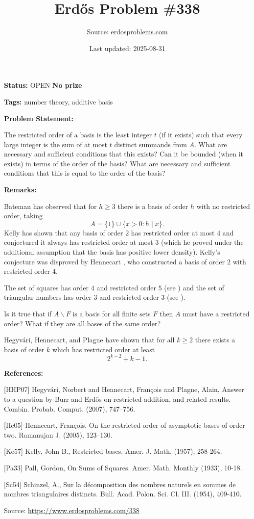 \documentclass{article}
\title{Erd\H{o}s Problem \#338}
\date{Last updated: 2025-08-31}
\author{Source: erdosproblems.com}
\begin{document}
\maketitle

\noindent\textbf{Status:} OPEN \quad \textbf{No prize}

\noindent\textbf{Tags:} number theory, additive basis

\medskip
\noindent\textbf{Problem Statement:}

The restricted order of a basis is the least integer $t$ (if it exists) such that every large integer is the sum of at most $t$ distinct summands from $A$. What are necessary and sufficient conditions that this exists? Can it be bounded (when it exists) in terms of the order of the basis? What are necessary and sufficient conditions that this is equal to the order of the basis?

\bigskip
\noindent\textbf{Remarks:}

Bateman has observed that for $h\geq 3$ there is a basis of order $h$ with no restricted order, taking\[A=\{1\}\cup \{x>0 : h\mid x\}.\]Kelly \cite{Ke57} has shown that any basis of order $2$ has restricted order at most $4$ and conjectured it always has restricted order at most $3$ (which he proved under the additional assumption that the basis has positive lower density). Kelly's conjecture was disproved by Hennecart \cite{He05}, who constructed a basis of order $2$ with restricted order $4$.

The set of squares has order $4$ and restricted order $5$ (see \cite{Pa33}) and the set of triangular numbers has order $3$ and restricted order $3$ (see \cite{Sc54}).

Is it true that if $A\backslash F$ is a basis for all finite sets $F$ then $A$ must have a restricted order? What if they are all bases of the same order?

Hegyv\'{a}ri, Hennecart, and Plagne \cite{HHP07} have shown that for all $k\geq2$ there exists a basis of order $k$ which has restricted order at least\[2^{k-2}+k-1.\]

\bigskip
\noindent\textbf{References:}

[HHP07] Hegyv\'{a}ri, Norbert and Hennecart, Fran\c cois and Plagne,
Alain, Answer to a question by {B}urr and {E}rd\H{o}s on restricted
addition, and related results. Combin. Probab. Comput. (2007), 747--756.
 
 [He05] Hennecart, Fran\c cois, On the restricted order of asymptotic bases of order two. Ramanujan J. (2005), 123--130.
 
 [Ke57] Kelly, John B., Restricted bases. Amer. J. Math. (1957), 258-264.
 
 [Pa33] Pall, Gordon, On Sums of Squares. Amer. Math. Monthly (1933), 10-18.
 
 [Sc54] Schinzel, A., Sur la d\'{e}composition des nombres naturels en sommes de nombres triangulaires distincts. Bull. Acad. Polon. Sci. Cl. III. (1954), 409-410.

\bigskip
\noindent\small{Source: \url{https://www.erdosproblems.com/338}}
\end{document}

